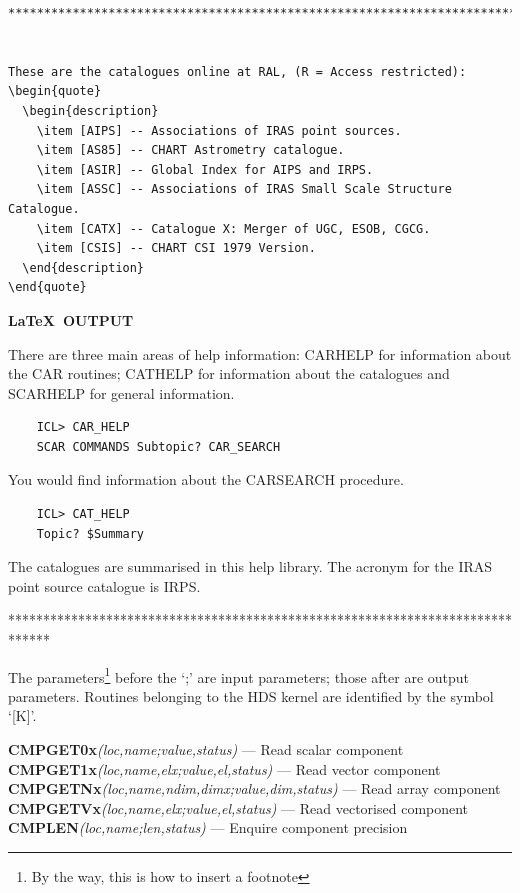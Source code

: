 \documentclass[twoside,11pt]{article}
\renewcommand{\_}{\texttt{\symbol{95}}}
\begin{document}
{\begin{verbatim}
******************************************************************************


These are the catalogues online at RAL, (R = Access restricted):
\begin{quote}
  \begin{description}
    \item [AIPS] -- Associations of IRAS point sources.
    \item [AS85] -- CHART Astrometry catalogue.
    \item [ASIR] -- Global Index for AIPS and IRPS.
    \item [ASSC] -- Associations of IRAS Small Scale Structure Catalogue.
    \item [CATX] -- Catalogue X: Merger of UGC, ESOB, CGCG.
    \item [CSIS] -- CHART CSI 1979 Version.
  \end{description}
\end{quote}
\end{verbatim}
}

\newpage

\begin{center}
  \textbf{\LaTeX\ OUTPUT}
\end{center}

There are three main areas of help information: CAR\_HELP for information 
about the CAR routines; CAT\_HELP for information about the catalogues and 
SCAR\_HELP for general information.
\begin{verbatim}
    ICL> CAR_HELP
    SCAR COMMANDS Subtopic? CAR_SEARCH
\end{verbatim}
You would find information about the CAR\_SEARCH procedure.
\begin{verbatim}
    ICL> CAT_HELP
    Topic? $Summary
\end{verbatim}
The catalogues are summarised in this help library.
The acronym for the IRAS point source catalogue is IRPS.


******************************************************************************

The parameters\footnote{By the way, this is how to insert a footnote} before
the `;' are input parameters; those after are output parameters.
Routines belonging to the HDS kernel are identified by the symbol `[K]'.

\noindent
\textbf{CMP\_GET0x}\emph{(loc,name;value,status)} --- Read scalar component\\
\textbf{CMP\_GET1x}\emph{(loc,name,elx;value,el,status)} --- Read vector component\\
\textbf{CMP\_GETNx}\emph{(loc,name,ndim,dimx;value,dim,status)} --- Read array 
component\\
\textbf{CMP\_GETVx}\emph{(loc,name,elx;value,el,status)} --- Read vectorised 
component\\
\textbf{CMP\_LEN}\emph{(loc,name;len,status)} --- Enquire component precision\\
\end{document}
